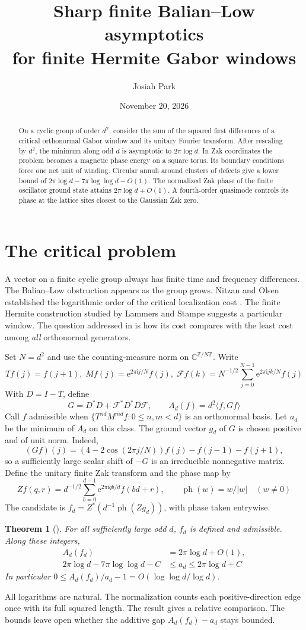 \documentclass[11pt,reqno]{amsart}
\title[Sharp finite Balian--Low asymptotics]{Sharp finite Balian--Low asymptotics\\for finite Hermite Gabor windows}
\author{Josiah Park}
\date{November 20, 2026}
\newtheorem{theorem}{Theorem}[section]
\newcommand{\C}{\mathbb C}
\newcommand{\Z}{\mathbb Z}
\newcommand{\ph}{\operatorname{ph}}
\newcommand{\ii}{\mathrm i}
\newcommand{\e}{\mathrm e}
\begin{document}
\begin{abstract}
On a cyclic group of order $d^2$, consider the sum of the squared first differences of a critical orthonormal Gabor window and its unitary Fourier transform. After rescaling by $d^2$, the minimum along odd $d$ is asymptotic to $2\pi\log d$. In Zak coordinates the problem becomes a magnetic phase energy on a square torus. Its boundary conditions force one net unit of winding. Circular annuli around clusters of defects give a lower bound of $2\pi\log d-7\pi\log\log d-O(1)$. The normalized Zak phase of the finite oscillator ground state attains $2\pi\log d+O(1)$. A fourth-order quasimode controls its phase at the lattice sites closest to the Gaussian Zak zero.
\end{abstract}
\maketitle
\section{The critical problem}
A vector on a finite cyclic group always has finite time and frequency differences. The Balian--Low obstruction appears as the group grows. Nitzan and Olsen established the logarithmic order of the critical localization cost \cite{NO}. The finite Hermite construction studied by Lammers and Stampe \cite{LS} suggests a particular window. The question addressed in \cite{Park} is how its cost compares with the least cost among \emph{all} orthonormal generators.

Set $N=d^2$ and use the counting-measure norm on $\C^{\Z/N\Z}$. Write
\[
 Tf(j)=f(j+1),\; Mf(j)=\e^{2\pi\ii j/N}f(j),\;
 \mathcal F f(k)=N^{-1/2}\sum_{j=0}^{N-1}\e^{2\pi\ii jk/N}f(j)
\]
With $D=I-T$, define
\[
 G=D^*D+\mathcal F^*D^*D\mathcal F,\qquad
 A_d(f)=d^2\langle f,Gf\rangle
\]
Call $f$ admissible when $\{T^{nd}M^{md}f:0\le n,m<d\}$ is an orthonormal basis. Let $a_d$ be the minimum of $A_d$ on this class. The ground vector $g_d$ of $G$ is chosen positive and of unit norm. Indeed,
\[
 (Gf)(j)=(4-2\cos(2\pi j/N))f(j)-f(j-1)-f(j+1),
\]
so a sufficiently large scalar shift of $-G$ is an irreducible nonnegative matrix. Define the unitary finite Zak transform and the phase map by
\[
 Zf(q,r)=d^{-1/2}\sum_{b=0}^{d-1}\e^{2\pi\ii qb/d}f(bd+r),
 \qquad \ph(w)=w/|w|\quad(w\ne0)
\]
The candidate is $f_d=Z^*(d^{-1}\ph(Zg_d))$, with phase taken entrywise.
\begin{theorem}[{\cite[Thm.~1.1]{Park}}]\label{thm:main}
For all sufficiently large odd $d$, $f_d$ is defined and admissible. Along these integers,
\begin{align*}
 A_d(f_d)&=2\pi\log d+O(1),\\
 2\pi\log d-7\pi\log\log d-C&\le a_d\le 2\pi\log d+C
\end{align*}
In particular $0\le A_d(f_d)/a_d-1=O(\log\log d/\log d)$.
\end{theorem}
All logarithms are natural. The normalization counts each positive-direction edge once with its full squared length. The result gives a relative comparison. The bounds leave open whether the additive gap $A_d(f_d)-a_d$ stays bounded.
\end{document}
